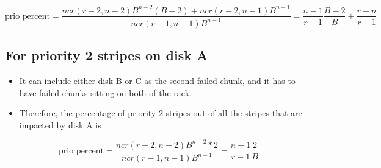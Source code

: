 \documentclass[journal]{IEEEtran}
\begin{document}
\begin{equation*}
  \text{prio percent}=\frac{ncr(r-2,n-2)B^{n-2}(B-2)+ncr(r-2,n-1)B^{n-1}}{ncr(r-1,n-1)B^{n-1}}=\frac{n-1}{r-1}\frac{B-2}{B}+\frac{r-n}{r-1}
\end{equation*}

\subsection*{For priority 2 stripes on disk A}
\begin{itemize}
  \item It can include either disk B or C as the second failed chunk, and it has to have failed chunks sitting on both of the rack.
  \item Therefore, the percentage of priority 2 stripes out of all the stripes that are impacted by disk A is
\end{itemize}

\begin{equation*}
  \text{prio percent}=\frac{ncr(r-2,n-2)B^{n-2}*2}{ncr(r-1,n-1)B^{n-1}}=\frac{n-1}{r-1}\frac{2}{B}
\end{equation*}
\end{document}

